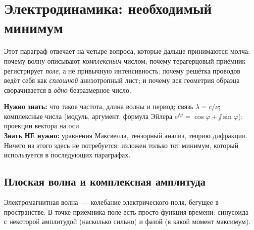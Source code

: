 %
\section{Электродинамика: необходимый минимум}
\label{sec:electrodynamics}

Этот параграф отвечает на четыре вопроса, которые дальше принимаются молча: почему волну
описывают \emph{комплексным} числом; почему терагерцовый приёмник регистрирует \emph{поле}, а не
привычную интенсивность; почему решётка проводов ведёт себя как \emph{сплошной} анизотропный
лист; и почему вся геометрия образца сворачивается в \emph{одно} безразмерное число.

\begin{tcolorbox}[enhanced,colback=cPanel,colframe=cGrid,boxrule=0.8pt,arc=2pt,
                  title={\bfseries\color{cAccent} Пререквизиты},coltitle=cAccent,
                  attach boxed title to top left={xshift=6pt,yshift=-2pt},
                  boxed title style={colback=cPanel,boxrule=0pt,arc=0pt},top=10pt]
\textbf{Нужно знать:} что такое частота, длина волны и период; связь $\lambda=c/\nu$; комплексные
числа (модуль, аргумент, формула Эйлера $e^{\jj\varphi}=\cos\varphi+\jj\sin\varphi$); проекции
вектора на оси.\\[0.3em]
\textbf{Знать НЕ нужно:} уравнения Максвелла, тензорный анализ, теорию дифракции. Ничего из
этого здесь не потребуется: изложен только тот минимум, который используется в последующих
параграфах.
\end{tcolorbox}

\subsection{Плоская волна и комплексная амплитуда}

\begin{intuition}
Электромагнитная волна~--- колебание электрического поля, бегущее в пространстве. В точке
приёмника поле есть просто функция времени: синусоида с некоторой амплитудой (насколько сильно)
и фазой (в какой момент максимум).
\end{intuition}


